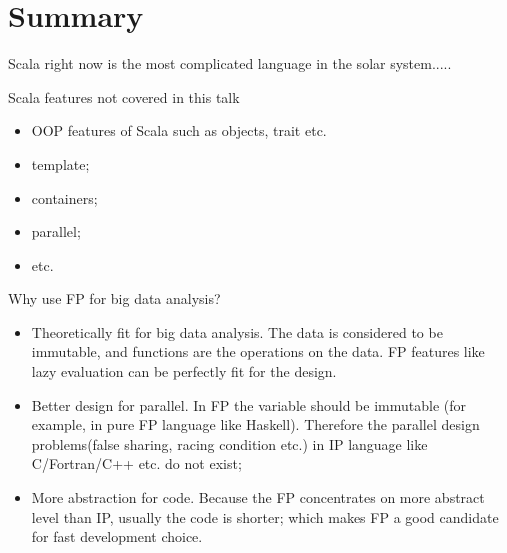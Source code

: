 \documentclass[notheorems, aspectratio=54]{beamer}
\begin{document}
\section{Summary}
\begin{frame}

Scala right now is the most complicated language in the solar system.....
\begin{block}{Scala features not covered in this talk}
\begin{itemize}
 \item OOP features of Scala such as objects, trait etc.
 \item template;
 \item containers;
 \item parallel; 
 \item etc.
\end{itemize} 
\end{block}

\end{frame}


\begin{frame}

\begin{block}{Why use FP for big data analysis?}
 \begin{itemize}
 \item Theoretically fit for big data analysis. The data is considered to be immutable, and functions are the operations on 
 the data. FP features like lazy evaluation can be perfectly fit for the design.
 \item Better design for parallel. In FP the variable should be immutable (for example, in pure FP language like Haskell).
 Therefore the parallel design problems(false sharing, racing condition etc.) in IP language like C/Fortran/C++ etc. do not 
 exist; 
 \item More abstraction for code. Because the FP concentrates on more abstract level than IP, usually the code is shorter;
 which makes FP a good candidate for fast development choice.
 \end{itemize}
\end{block} 

\end{frame}

\end{document}
